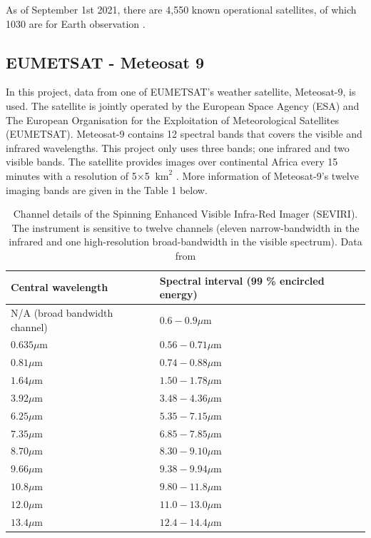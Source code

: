 As of September 1st 2021, there are 4,550 known operational satellites, of which 1030 are for Earth observation \cite{Sat_Data}. 


\subsection{EUMETSAT - Meteosat 9}


In this project, data from one of EUMETSAT's weather satellite, Meteosat-9, is used. The satellite is jointly operated by the European Space Agency (ESA) and The European Organisation for the Exploitation of Meteorological Satellites (EUMETSAT). Meteosat-9 contains 12 spectral bands that covers the visible and infrared wavelengths. This project only uses three bands; one infrared and two visible bands. The satellite provides images over continental Africa every 15 minutes with a resolution of 5$\times$5 $\mathrm{~km}^{2}$ \cite{Meteosat9}. More information of Meteosat-9's twelve imaging bands are given in the Table 1 below.

\begin{table}[H]
\centering
\begin{tabular}{|l|l|}
\hline \textbf{Central wavelength} & \textbf{Spectral interval (99 \% encircled energy)} \\
\hline N/A (broad bandwidth channel) &
$0.6-0.9 \mu \mathrm{m}$ \\
\hline $0.635 \mu \mathrm{m}$ & $0.56-0.71 \mu \mathrm{m}$ \\
\hline $0.81 \mu \mathrm{m}$ & $0.74-0.88 \mu \mathrm{m}$ \\
\hline $1.64 \mu \mathrm{m}$ & $1.50-1.78 \mu \mathrm{m}$ \\
\hline $3.92 \mu \mathrm{m}$ & $3.48-4.36 \mu \mathrm{m}$ \\
\hline $6.25 \mu \mathrm{m}$ & $5.35-7.15 \mu \mathrm{m}$ \\
\hline $7.35 \mu \mathrm{m}$ & $6.85-7.85 \mu \mathrm{m}$ \\
\hline $8.70 \mu \mathrm{m}$ & $8.30-9.10 \mu \mathrm{m}$ \\
\hline $9.66 \mu \mathrm{m}$ & $9.38-9.94 \mu \mathrm{m}$ \\
\hline $10.8 \mu \mathrm{m}$ & $9.80-11.8 \mu \mathrm{m}$ \\
\hline $12.0 \mu \mathrm{m}$ & $11.0-13.0 \mu \mathrm{m}$ \\
\hline $13.4 \mu \mathrm{m}$ & $12.4-14.4 \mu \mathrm{m}$ \\
\hline
\end{tabular}
\caption{\label{tab:Table1} Channel details of the Spinning Enhanced Visible Infra-Red Imager (SEVIRI). The instrument is sensitive to twelve channels (eleven narrow-bandwidth in the infrared and one high-resolution broad-bandwidth in the visible spectrum). Data from \cite{Table1}}
\end{table}



